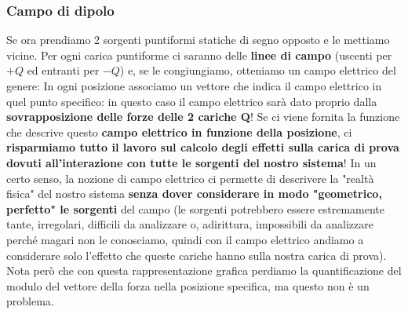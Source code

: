         \subsubsection{Campo di dipolo}
            Se ora prendiamo 2 sorgenti puntiformi statiche di segno opposto e le mettiamo vicine. Per ogni carica puntiforme ci saranno delle \textbf{linee di campo} (uscenti per $+Q$ ed entranti per $-Q$) e, se le congiungiamo, otteniamo un campo elettrico del genere:
            In ogni posizione associamo un vettore che indica il campo elettrico in quel punto specifico: in questo caso il campo elettrico sarà dato proprio dalla \textbf{sovrapposizione delle forze delle 2 cariche Q}! Se ci viene fornita la funzione che descrive questo \textbf{campo elettrico in funzione della posizione}, ci \textbf{risparmiamo tutto il lavoro sul calcolo degli effetti sulla carica di prova dovuti all'interazione con tutte le sorgenti del nostro sistema}! In un certo senso, la nozione di campo elettrico ci permette di descrivere la "realtà fisica" del nostro sistema \textbf{senza dover considerare in modo "geometrico, perfetto" le sorgenti} del campo (le sorgenti potrebbero essere estremamente tante, irregolari, difficili da analizzare o, adirittura, impossibili da analizzare perché magari non le conosciamo, quindi con il campo elettrico andiamo a considerare solo l'effetto che queste cariche hanno sulla nostra carica di prova).\bigskip\\
            Nota però che con questa rappresentazione grafica perdiamo la quantificazione del modulo del vettore della forza nella posizione specifica, ma questo non è un problema.

